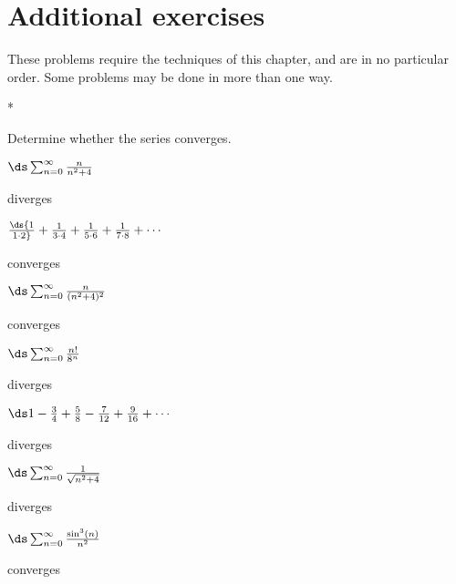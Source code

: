 \section{Additional exercises}{}{}

These problems require the techniques of this chapter, and are in no
particular order. Some problems may be done in more than one way.

\begin{exercises}*

Determine whether the series converges.

\begin{exercise} $\ds\sum_{n=0}^\infty {n\over n^2+4}$
\begin{answer} diverges
\end{answer}\end{exercise}

\begin{exercise} $\ds {1\over 1\cdot 2}+{1\over 3\cdot
  4}+{1\over 5\cdot 6}+{1\over 7\cdot 8}+\cdots$
\begin{answer} converges
\end{answer}\end{exercise}

\begin{exercise} $\ds\sum_{n=0}^\infty {n\over (n^2+4)^2}$
\begin{answer} converges
\end{answer}\end{exercise}

\begin{exercise} $\ds\sum_{n=0}^\infty {n!\over 8^n}$
\begin{answer} diverges
\end{answer}\end{exercise}

\begin{exercise} $\ds 1-{3\over4}+{5\over8}-{7\over12}+{9\over16}+\cdots$
\begin{answer} diverges
\end{answer}\end{exercise}

\begin{exercise} $\ds\sum_{n=0}^\infty {1\over \sqrt{n^2+4}}$
\begin{answer} diverges
\end{answer}\end{exercise}

\begin{exercise} $\ds\sum_{n=0}^\infty {\sin^3(n)\over n^2}$
\begin{answer} converges
\end{answer}\end{exercise}


\end{exercises}
